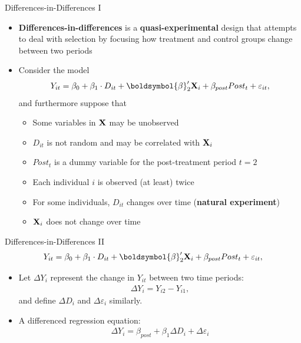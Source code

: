 \documentclass[aspectratio=169,11pt]{beamer}
\begin{document}
\begin{frame}{Differences-in-Differences I}
\begin{itemize}
  \item {\bf Differences-in-differences} is a {\bf quasi-experimental} design
  that attempts to deal with selection by focusing how treatment and control
  groups change between two periods

  \smallskip
  \item Consider the model  
  \begin{align*}
  Y_{it}=\beta_{0}+\beta_{1} \cdot D_{it}+\boldsymbol{\beta}_2' {\bf X}_{i}+ \beta_{post}  Post_t  + \varepsilon_{it},
  \end{align*}
  and furthermore suppose that
  \begin{itemize}
    \item Some variables in ${\bf X}$ may be unobserved
    \item $D_{it}$ is not random and may be correlated with ${\bf X}_{i}$
    \item $Post_t$ is a dummy variable for the post-treatment period $t=2$
    \item Each individual $i$ is observed (at least) twice
    \item For some individuals, $D_{it}$ changes over time ({\bf natural experiment})
    \item ${\bf X}_{i}$ does not change over time
  \end{itemize}

\end{itemize}
\end{frame}


\begin{frame}{Differences-in-Differences II}
\begin{align*}
  Y_{it}=\beta_{0}+\beta_{1}\cdot D_{it}+\boldsymbol{\beta}_2' {\bf X}_{i} + \beta_{post}  Post_t  + \varepsilon_{it},
\end{align*}

\begin{itemize}
  \item Let $\Delta Y_{i}$ represent the change in $Y_{it}$ between two time periods:
  \begin{align*}
  \Delta Y_{i} = Y_{i2} - Y_{i1},
  \end{align*}
  and define $\Delta D_i$ and $\Delta \varepsilon_i$ similarly.

  \medskip
  \item A differenced regression equation:
  \begin{align*}
  \Delta Y_{i}=\beta_{post} + \beta_{1} \Delta D_{i}+ \Delta \varepsilon_{i}
  \end{align*}

\end{itemize}
\end{frame}
\end{document}
